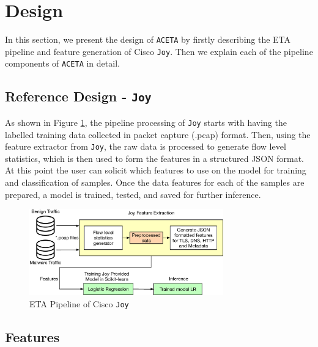 \section{Design}
\label{sec:design}

In this section, we present the design of \texttt{ACETA} by firstly describing the ETA pipeline and feature generation of Cisco \texttt{Joy}. Then we explain each of the pipeline components of \texttt{ACETA} in detail. 

\subsection{Reference Design - \texttt{Joy}}
As shown in Figure \ref{figure:joy}, the pipeline processing of \texttt{Joy} starts with having the labelled training data collected in packet capture (.pcap) format. Then, using the feature extractor from \texttt{Joy}, the raw data is processed to generate flow level statistics, which is then used to form the features in a structured JSON format. At this point the user can solicit which features to use on the model for training and classification of samples. Once the data features for each of the samples are prepared, a model is trained, tested, and saved for further inference.

\begin{figure}[h!]
  \centering
  \includegraphics[width=3.3in]{./fig/joy-pipeline.eps}
  \caption{ETA Pipeline of Cisco \texttt{Joy}}
  \label{figure:joy}
\end{figure}

\subsection{Features}

